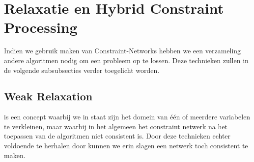 \section{Relaxatie en Hybrid Constraint Processing}
\label{ss:relaxationAndHybridConstraintProcessing}
Indien we gebruik maken van Constraint-Networks hebben we een verzameling andere algoritmen nodig om een probleem op te lossen. Deze technieken zullen in de volgende subsubsecties verder toegelicht worden.
\subsection{Weak Relaxation}
 is een concept waarbij we in staat zijn het domein van \'e\'en of meerdere variabelen te verkleinen, maar waarbij in het algemeen het constraint netwerk na het toepassen van de algoritmen niet consistent is. Door deze technieken echter voldoende te herhalen door  kunnen we erin slagen een netwerk toch consistent te maken.
